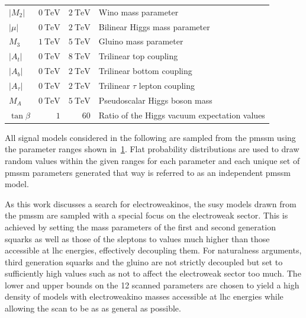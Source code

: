 \begin{table}
\begin{tabular} {l r r l}
		$\vert M_2\vert$ & $\SI{0}{\TeV}$ & $\SI{2}{\TeV}$ & Wino mass parameter \\
		$\vert\mu\vert$ & $\SI{0}{\TeV}$ & $\SI{2}{\TeV}$ & Bilinear Higgs mass parameter \\
		$M_3$ & $\SI{1}{\TeV}$ & $\SI{5}{\TeV}$ & Gluino mass parameter \\
		\midrule
		$\vert A_t\vert$ & $\SI{0}{\TeV}$ & $\SI{8}{\TeV}$ & Trilinear top coupling \\
		$\vert A_b\vert$ & $\SI{0}{\TeV}$ & $\SI{2}{\TeV}$ & Trilinear bottom coupling \\
		$\vert A_\tau\vert$ & $\SI{0}{\TeV}$ & $\SI{2}{\TeV}$ & Trilinear $\tau$ lepton coupling \\
		$M_A$ & $\SI{0}{\TeV}$ & $\SI{5}{\TeV}$ & Pseudoscalar Higgs boson mass \\
		$\tan\beta$ & $1$ & $60$ & Ratio of the Higgs vacuum expectation values \\
		\bottomrule
	\end{tabular}

	\label{fig:pmssm_scan_ranges}   
\end{table}

All signal models considered in the following are sampled from the \gls{pmssm} using the parameter ranges shown in~\cref{fig:pmssm_scan_ranges}. Flat probability distributions are used to draw random values within the given ranges for each parameter and each unique set of \gls{pmssm} parameters generated that way is referred to as an independent \gls{pmssm} model. 

As this work discusses a search for electroweakinos, the \gls{susy} models drawn from the \gls{pmssm} are sampled with a special focus on the electroweak sector.
This is achieved by setting the mass parameters of the first and second generation squarks as well as those of the sleptons to values much higher than those accessible at \gls{lhc} energies, effectively decoupling them.
For naturalness arguments, third generation squarks and the gluino are not strictly decoupled but set to sufficiently high values such as not to affect the electroweak sector too much.
The lower and upper bounds on the 12 scanned parameters are chosen to yield a high density of models with electroweakino masses accessible at \gls{lhc} energies while allowing the scan to be as as general as possible. 


